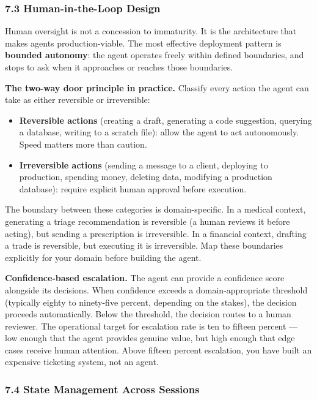 \documentclass[11pt, a4paper]{article}
\providecommand{\tightlist}{%
  \setlength{\itemsep}{0pt}\setlength{\parskip}{0pt}}
\begin{document}
\hypertarget{human-in-the-loop-design}{%
\subsubsection{7.3 Human-in-the-Loop
Design}\label{human-in-the-loop-design}}

Human oversight is not a concession to immaturity. It is the
architecture that makes agents production-viable. The most effective
deployment pattern is \textbf{bounded autonomy}: the agent operates
freely within defined boundaries, and stops to ask when it approaches or
reaches those boundaries.

\textbf{The two-way door principle in practice.} Classify every action
the agent can take as either reversible or irreversible:

\begin{itemize}
\tightlist
\item
  \textbf{Reversible actions} (creating a draft, generating a code
  suggestion, querying a database, writing to a scratch file): allow the
  agent to act autonomously. Speed matters more than caution.
\item
  \textbf{Irreversible actions} (sending a message to a client,
  deploying to production, spending money, deleting data, modifying a
  production database): require explicit human approval before
  execution.
\end{itemize}

The boundary between these categories is domain-specific. In a medical
context, generating a triage recommendation is reversible (a human
reviews it before acting), but sending a prescription is irreversible.
In a financial context, drafting a trade is reversible, but executing it
is irreversible. Map these boundaries explicitly for your domain before
building the agent.

\textbf{Confidence-based escalation.} The agent can provide a confidence
score alongside its decisions. When confidence exceeds a
domain-appropriate threshold (typically eighty to ninety-five percent,
depending on the stakes), the decision proceeds automatically. Below the
threshold, the decision routes to a human reviewer. The operational
target for escalation rate is ten to fifteen percent --- low enough that
the agent provides genuine value, but high enough that edge cases
receive human attention. Above fifteen percent escalation, you have
built an expensive ticketing system, not an agent.

\hypertarget{state-management-across-sessions}{%
\subsubsection{7.4 State Management Across
Sessions}\label{state-management-across-sessions}}
\end{document}
